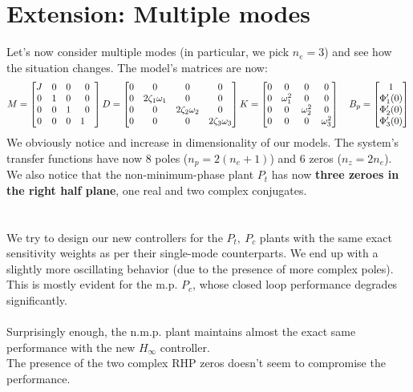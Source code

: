 \documentclass[a4paper, 12pt]{article}
\begin{document}
\section{Extension: Multiple modes}
Let's now consider multiple modes (in particular, we pick $n_e = 3$) and see how the situation changes.
The model's matrices are now: 
\begin{equation*}
    M = \begin{bmatrix}
    J & 0  & 0  & 0\\
    0 & 1 & 0  & 0\\
 0 & 0 & 1  & 0\\
 0 & 0 & 0  & 1 \quad
 \end{bmatrix}
D = \begin{bmatrix}
0 & 0 & 0 & 0\\ 
0 & 2 \zeta_1 \omega_1 &0 & 0\\
0 & 0 &  2 \zeta_2 \omega_2 & 0\\
0 & 0 & 0 &  2 \zeta_3\omega_3
\end{bmatrix}
K = \begin{bmatrix}
0 & 0 & 0 & 0\\
0 & \omega_1^2 & 0 & 0\\
0 & 0 &  \omega_2^2 & 0\\
0 & 0 &  0 & \omega_3^2\cr 
\end{bmatrix} \quad
B_p = \begin{bmatrix}
1 \cr \Phi'_1(0) \\ \Phi'_2(0)  \\
\Phi'_3(0)
\end{bmatrix}
\end{equation*}
We obviously notice and increase in dimensionality of our models. The system's transfer functions have now 8 poles ($n_p = 2(n_e + 1)$) and 6 zeros ($n_z = 2n_e$).\\
We also notice that the non-minimum-phase plant $P_t$ has now \textbf{three zeroes in the right half plane}, one real and two complex conjugates.
\\ \\ \\
We try to design our new controllers for the $P_t,\ P_c$ plants with the same exact sensitivity weights as per their single-mode counterparts. We end up with a slightly more oscillating behavior (due to the presence of more complex poles). This is mostly evident for the m.p. $P_c$, whose closed loop performance degrades significantly.
\\ \\
Surprisingly enough, the n.m.p. plant maintains almost the exact same performance with the new $H_\infty$ controller.\\ The presence of the two complex RHP zeros doesn't seem to compromise the performance.\\
\end{document}
